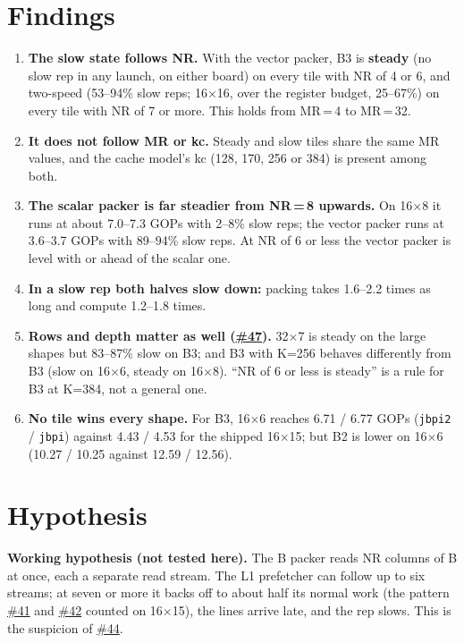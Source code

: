 \documentclass[10pt,a4paper]{article}
\newcommand{\iss}[1]{\href{https://github.com/JieGH/RVV_code_gen_via_MLIR_xDSL/issues/#1}{\##1}}
\newcommand{\up}[1]{\textcolor{red!70!black}{#1}}
\newcommand{\good}[1]{\textcolor{green!45!black}{\textbf{#1}}}
\begin{document}
\section{Findings}
\begin{enumerate}
  \item \textbf{The slow state follows NR.} With the vector packer, B3 is \good{steady} (no slow rep in any launch, on
  either board) on every tile with NR of 4 or 6, and \up{two-speed} (53--94\% slow reps; 16$\times$16, over the register budget, 25--67\%) on every tile with NR of 7 or
  more. This holds from MR\,=\,4 to MR\,=\,32.
  \item \textbf{It does not follow MR or kc.} Steady and slow tiles share the same MR values, and the cache model's kc
  (128, 170, 256 or 384) is present among both.
  \item \textbf{The scalar packer is far steadier from NR\,=\,8 upwards.} On 16$\times$8 it runs at about 7.0--7.3 GOPs
  with 2--8\% slow reps; the vector packer runs at 3.6--3.7 GOPs with 89--94\% slow reps. At NR of 6 or less the
  vector packer is level with or ahead of the scalar one.
  \item \textbf{In a slow rep both halves slow down:} packing takes 1.6--2.2 times as long and compute 1.2--1.8 times.
  \item \textbf{Rows and depth matter as well (\iss{47}).} 32$\times$7 is steady on the large shapes but 83--87\% slow
  on B3; and B3 with K=256 behaves differently from B3 (slow on 16$\times$6, steady on 16$\times$8). ``NR of 6 or less
  is steady'' is a rule for B3 at K=384, not a general one.
  \item \textbf{No tile wins every shape.} For B3, 16$\times$6 reaches 6.71 / 6.77 GOPs (\texttt{jbpi2} / \texttt{jbpi})
  against 4.43 / 4.53 for the shipped 16$\times$15; but B2 is lower on 16$\times$6 (10.27 / 10.25 against
  12.59 / 12.56).
\end{enumerate}

\section{Hypothesis}
\textbf{Working hypothesis (not tested here).} The B packer reads NR columns of B at once, each a separate read stream.
The L1 prefetcher can follow up to six streams; at seven or more it backs off to about half its normal work (the pattern
\iss{41} and \iss{42} counted on 16$\times$15), the lines arrive late, and the rep slows. This is the suspicion of \iss{44}.
\end{document}
